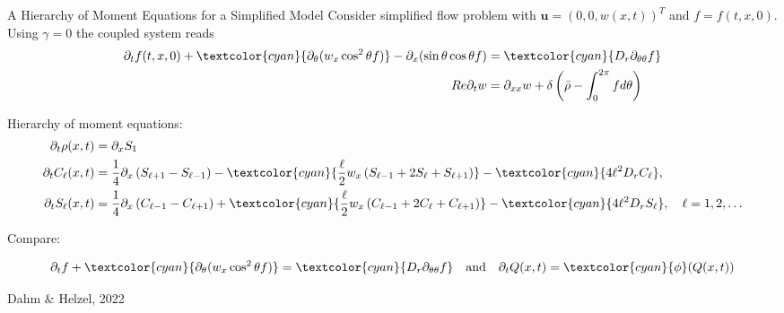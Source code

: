 \begin{frame}{A Hierarchy of Moment Equations for a Simplified Model}
	\scriptsize
	Consider simplified flow problem with $\boldsymbol{u} = (0,0, w(x,t))^T$ and $f=f(t,x,0)$. Using $\gamma = 0$ the coupled system reads
	\begin{align*}
		\partial_t f(t,x,0) +  \textcolor{cyan}{\partial_\theta(w_x \cos^2 \theta f)} - \partial_x (\sin \theta \cos \theta f) &=  \textcolor{cyan}{D_r \partial_{\theta\theta} f} \\
		R e \partial_t w &=\partial_{x x} w+\delta\left(\bar{\rho}-\int_0^{2 \pi} f d \theta\right)
	\end{align*}

	Hierarchy of moment equations:
	\begin{align*}
		\partial_t \rho(x, t) & = \partial_x S_1 \\
		\partial_t C_{\ell}(x, t) & = \frac{1}{4} \partial_x\left(S_{\ell+1}-S_{\ell-1}\right)- \textcolor{cyan}{\frac{\ell}{2} w_x\left(S_{\ell-1}+2 S_{\ell}+S_{\ell+1}\right)}- \textcolor{cyan}{4 \ell^2 D_r C_{\ell}}, \\
		\partial_t S_{\ell}(x, t) & =\frac{1}{4} \partial_x\left(C_{\ell-1}-C_{\ell+1}\right)+  \textcolor{cyan}{\frac{\ell}{2} w_x\left(C_{\ell-1}+2 C_{\ell}+C_{\ell+1}\right)}- \textcolor{cyan}{4 \ell^2 D_r S_{\ell}}, \quad \ell=1,2, \ldots
	\end{align*}

	Compare:
	
	\begin{align*}
		\partial_t f + \textcolor{cyan}{\partial_\theta(w_x \cos^2 \theta f)} = \textcolor{cyan}{D_r \partial_{\theta\theta} f} \quad \text{and} \quad \partial_t Q(x,t) = \textcolor{cyan}{\phi}(Q(x,t))
	\end{align*}
	
	\begin{beamercolorbox}[sep=1em,wd=\linewidth,right]{}
		\tiny{Dahm $\&$ Helzel, 2022}
	\end{beamercolorbox}
\end{frame}



